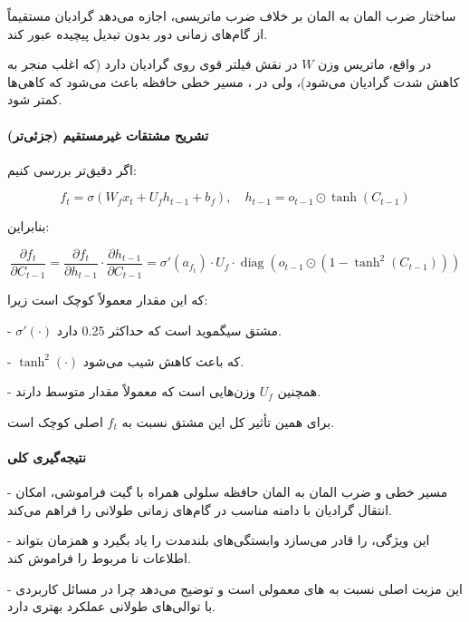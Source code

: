 \documentclass{article}
\begin{document}
ساختار ضرب المان به المان بر خلاف ضرب ماتریسی، اجازه می‌دهد گرادیان مستقیماً از گام‌های زمانی دور بدون تبدیل پیچیده عبور کند.

در واقع، ماتریس وزن \(W\) در  نقش فیلتر قوی روی گرادیان دارد (که اغلب منجر به کاهش شدت گرادیان می‌شود)، ولی در ، مسیر خطی حافظه باعث می‌شود که کاهی‌ها کمتر شود.


\paragraph{تشریح مشتقات غیرمستقیم (جزئی‌تر)} 

اگر دقیق‌تر بررسی کنیم:

\begin{equation}
f_t = \sigma\left(W_f x_t + U_f h_{t-1} + b_f\right), \quad h_{t-1} = o_{t-1} \odot \tanh(C_{t-1})
\end{equation}

بنابراین:

\begin{equation}
\frac{\partial f_t}{\partial C_{t-1}} = \frac{\partial f_t}{\partial h_{t-1}} \cdot \frac{\partial h_{t-1}}{\partial C_{t-1}} = \sigma'(a_{f_t}) \cdot U_f \cdot \operatorname{diag}\left(o_{t-1} \odot (1 - \tanh^2(C_{t-1}))\right)
\end{equation}

که این مقدار معمولاً کوچک است زیرا:

- \(\sigma'(\cdot)\) مشتق سیگموید است که حداکثر 0.25 دارد.

- \(\tanh^2(\cdot)\) که باعث کاهش شیب می‌شود.

- همچنین \(U_f\) وزن‌هایی است که معمولاً مقدار متوسط دارند.

برای همین تأثیر کل این مشتق نسبت به \(f_t\) اصلی کوچک است.


\paragraph{نتیجه‌گیری کلی}

- مسیر خطی و ضرب المان به المان حافظه سلولی همراه با گیت فراموشی، امکان انتقال گرادیان با دامنه مناسب در گام‌های زمانی طولانی را فراهم می‌کند.

- این ویژگی،  را قادر می‌سازد وابستگی‌های بلندمدت را یاد بگیرد و همزمان بتواند اطلاعات نا مربوط را فراموش کند.

- این مزیت اصلی  نسبت به های معمولی است و توضیح می‌دهد چرا  در مسائل کاربردی با توالی‌های طولانی عملکرد بهتری دارد.
\end{document}
